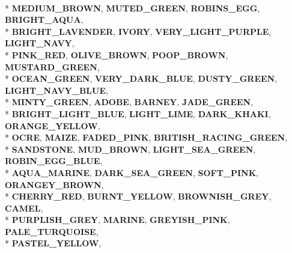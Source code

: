 \begin{DoxyCompactItemize}
\\*
{\bfseries M\+E\+D\+I\+U\+M\+\_\+\+B\+R\+O\+WN}, 
{\bfseries M\+U\+T\+E\+D\+\_\+\+G\+R\+E\+EN}, 
{\bfseries R\+O\+B\+I\+N\+S\+\_\+\+E\+GG}, 
{\bfseries B\+R\+I\+G\+H\+T\+\_\+\+A\+Q\+UA}, 
\\*
{\bfseries B\+R\+I\+G\+H\+T\+\_\+\+L\+A\+V\+E\+N\+D\+ER}, 
{\bfseries I\+V\+O\+RY}, 
{\bfseries V\+E\+R\+Y\+\_\+\+L\+I\+G\+H\+T\+\_\+\+P\+U\+R\+P\+LE}, 
{\bfseries L\+I\+G\+H\+T\+\_\+\+N\+A\+VY}, 
\\*
{\bfseries P\+I\+N\+K\+\_\+\+R\+ED}, 
{\bfseries O\+L\+I\+V\+E\+\_\+\+B\+R\+O\+WN}, 
{\bfseries P\+O\+O\+P\+\_\+\+B\+R\+O\+WN}, 
{\bfseries M\+U\+S\+T\+A\+R\+D\+\_\+\+G\+R\+E\+EN}, 
\\*
{\bfseries O\+C\+E\+A\+N\+\_\+\+G\+R\+E\+EN}, 
{\bfseries V\+E\+R\+Y\+\_\+\+D\+A\+R\+K\+\_\+\+B\+L\+UE}, 
{\bfseries D\+U\+S\+T\+Y\+\_\+\+G\+R\+E\+EN}, 
{\bfseries L\+I\+G\+H\+T\+\_\+\+N\+A\+V\+Y\+\_\+\+B\+L\+UE}, 
\\*
{\bfseries M\+I\+N\+T\+Y\+\_\+\+G\+R\+E\+EN}, 
{\bfseries A\+D\+O\+BE}, 
{\bfseries B\+A\+R\+N\+EY}, 
{\bfseries J\+A\+D\+E\+\_\+\+G\+R\+E\+EN}, 
\\*
{\bfseries B\+R\+I\+G\+H\+T\+\_\+\+L\+I\+G\+H\+T\+\_\+\+B\+L\+UE}, 
{\bfseries L\+I\+G\+H\+T\+\_\+\+L\+I\+ME}, 
{\bfseries D\+A\+R\+K\+\_\+\+K\+H\+A\+KI}, 
{\bfseries O\+R\+A\+N\+G\+E\+\_\+\+Y\+E\+L\+L\+OW}, 
\\*
{\bfseries O\+C\+RE}, 
{\bfseries M\+A\+I\+ZE}, 
{\bfseries F\+A\+D\+E\+D\+\_\+\+P\+I\+NK}, 
{\bfseries B\+R\+I\+T\+I\+S\+H\+\_\+\+R\+A\+C\+I\+N\+G\+\_\+\+G\+R\+E\+EN}, 
\\*
{\bfseries S\+A\+N\+D\+S\+T\+O\+NE}, 
{\bfseries M\+U\+D\+\_\+\+B\+R\+O\+WN}, 
{\bfseries L\+I\+G\+H\+T\+\_\+\+S\+E\+A\+\_\+\+G\+R\+E\+EN}, 
{\bfseries R\+O\+B\+I\+N\+\_\+\+E\+G\+G\+\_\+\+B\+L\+UE}, 
\\*
{\bfseries A\+Q\+U\+A\+\_\+\+M\+A\+R\+I\+NE}, 
{\bfseries D\+A\+R\+K\+\_\+\+S\+E\+A\+\_\+\+G\+R\+E\+EN}, 
{\bfseries S\+O\+F\+T\+\_\+\+P\+I\+NK}, 
{\bfseries O\+R\+A\+N\+G\+E\+Y\+\_\+\+B\+R\+O\+WN}, 
\\*
{\bfseries C\+H\+E\+R\+R\+Y\+\_\+\+R\+ED}, 
{\bfseries B\+U\+R\+N\+T\+\_\+\+Y\+E\+L\+L\+OW}, 
{\bfseries B\+R\+O\+W\+N\+I\+S\+H\+\_\+\+G\+R\+EY}, 
{\bfseries C\+A\+M\+EL}, 
\\*
{\bfseries P\+U\+R\+P\+L\+I\+S\+H\+\_\+\+G\+R\+EY}, 
{\bfseries M\+A\+R\+I\+NE}, 
{\bfseries G\+R\+E\+Y\+I\+S\+H\+\_\+\+P\+I\+NK}, 
{\bfseries P\+A\+L\+E\+\_\+\+T\+U\+R\+Q\+U\+O\+I\+SE}, 
\\*
{\bfseries P\+A\+S\+T\+E\+L\+\_\+\+Y\+E\+L\+L\+OW}, 

\end{DoxyCompactItemize}
